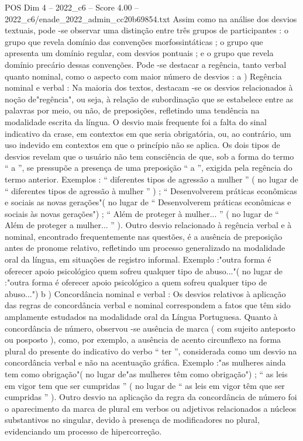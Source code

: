 \begin{textsample}{POS Dim 4 – 2022\_c6 – Score 4.00 – 2022\_c6/enade\_2022\_admin\_cc20b69854.txt}
Assim como na análise dos desvios textuais, pode -se observar uma distinção entre três grupos de participantes : o grupo que revela domínio das convenções morfossintáticas ; o grupo que apresenta um domínio regular, com desvios pontuais ; e o grupo que revela domínio precário dessas convenções.
Pode -se destacar a regência, tanto verbal quanto nominal, como o aspecto com maior número de desvios : a ) Regência nominal e verbal : Na maioria dos textos, destacam -se os desvios relacionados à noção de"regência", ou seja, à relação de subordinação que se estabelece entre as palavras por meio, ou não, de preposições, refletindo uma tendência na modalidade escrita da língua.
O desvio mais frequente foi a falta do sinal indicativo da crase, em contextos em que seria obrigatória, ou, ao contrário, um uso indevido em contextos em que o princípio não se aplica.
Os dois tipos de desvios revelam que o usuário não tem consciência de que, sob a forma do termo “ a ”, se pressupõe a presença de uma preposição “ a ”, exigida pela regência do termo anterior.
Exemplos : “ diferentes tipos de agressão a mulher ” ( no lugar de “ diferentes tipos de agressão à mulher ” ) ; “ Desenvolverem práticas econômicas e sociais as novas gerações"( no lugar de “ Desenvolverem práticas econômicas e sociais às novas gerações") ; “ Além de proteger à mulher... ” ( no lugar de “ Além de proteger a mulher... ” ).
Outro desvio relacionado à regência verbal e à nominal, encontrado frequentemente nas questões, é a ausência de preposição antes de pronome relativo, refletindo um processo generalizado na modalidade oral da língua, em situações de registro informal.
Exemplo :"outra forma é oferecer apoio psicológico quem sofreu qualquer tipo de abuso..."( no lugar de :"outra forma é oferecer apoio psicológico a quem sofreu qualquer tipo de abuso...") b ) Concordância nominal e verbal : Os desvios relativos à aplicação das regras de concordância verbal e nominal correspondem a fatos que têm sido amplamente estudados na modalidade oral da Língua Portuguesa.
Quanto à concordância de número, observou -se ausência de marca ( com sujeito anteposto ou posposto ), como, por exemplo, a ausência de acento circunflexo na forma plural do presente do indicativo do verbo “ ter ”, considerada como um desvio na concordância verbal e não na acentuação gráfica.
Exemplo :"as mulheres ainda tem como obrigação"( no lugar de"as mulheres têm como obrigação") ; “ as leis em vigor tem que ser cumpridas ” ( no lugar de “ as leis em vigor têm que ser cumpridas ” ).
Outro desvio na aplicação da regra da concordância de número foi o aparecimento da marca de plural em verbos ou adjetivos relacionados a núcleos substantivos no singular, devido à presença de modificadores no plural, evidenciando um processo de hipercorreção.

\end{textsample}
